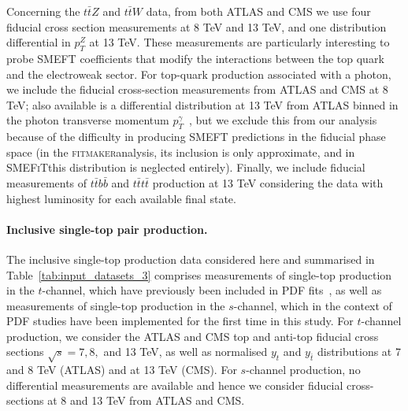 \documentclass[withindex,glossary]{cam-thesis}
\newcommand{\fitm}{\textsc{fitmaker}}
\newcommand{\smefit}{\textsc{SMEFiT}}
\begin{document}






Concerning the $t\bar{t}Z$ and $t\bar{t}W$ data,
from both ATLAS and CMS we use four fiducial cross section measurements at 8 TeV
and 13 TeV,
and one distribution differential in $p_T^Z$ at 13 TeV.
%
These measurements are particularly interesting to probe SMEFT coefficients that
modify the interactions between the top quark and the electroweak sector.
%
For top-quark production associated with a photon, we include the fiducial
cross-section measurements from ATLAS and CMS at 8 TeV; also available is a
differential distribution at 13 TeV from ATLAS binned in the photon transverse
momentum $p_T^\gamma$~\cite{Aad:2020axn}, but we exclude this from our analysis because of the difficulty in
producing SMEFT predictions in the fiducial phase space (in the \fitm analysis, its inclusion
is only approximate, and in \smefit this distribution is neglected entirely).
%
Finally, we include fiducial measurements of
$t\bar{t}b\bar{b}$ and $t\bar{t}t\bar{t}$ production at 13 TeV considering
the data with highest luminosity for each available final state.
%

\paragraph{Inclusive single-top pair production.}
%
The inclusive single-top production data considered here
and summarised in Table~\ref{tab:input_datasets_3}
comprises measurements of
single-top production in the $t$-channel, which have previously been included
in PDF fits~\cite{Nocera:2019wyk,NNPDF:2021njg}, as well as measurements of single-top production in the $s$-channel, which in the context of PDF studies have been implemented for the first time in this study.
%
For $t$-channel production, we consider the ATLAS and CMS top and anti-top fiducial cross sections
$\sqrt{s}=7,8,$ and 13 TeV, as well as normalised $y_t$ and $y_{\bar{t}}$ distributions
at 7 and 8 TeV (ATLAS) and at 13 TeV (CMS).
%
For  $s$-channel production, no differential measurements are available and hence
we consider fiducial cross-sections at 8 and 13 TeV from ATLAS and CMS.
\end{document}
